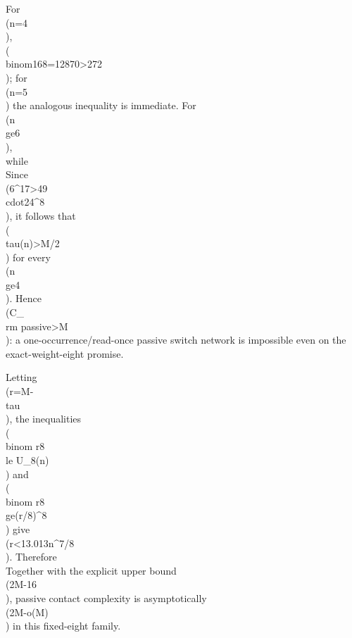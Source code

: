 For \\(n=4\\), \\(\\binom{16}{8}=12870>272\\); for \\(n=5\\) the analogous inequality is immediate.
For \\(n\\ge6\\),
\\[
\\frac M2=4\\binom n3\\ge n^3/3,\\qquad
\\binom{M/2}{8}\\ge(n^3/24)^8,
\\]
while
\\[ U_8(n)\\le(581/12)n^7<49n^7. \\]
Since \\(6^{17}>49\\cdot24^8\\), it follows that \\(\\tau(n)>M/2\\) for every \\(n\\ge4\\).
Hence \\(C_{\\rm passive}>M\\): a one-occurrence/read-once passive switch network is
impossible even on the exact-weight-eight promise.

Letting \\(r=M-\\tau\\), the inequalities \\(\\binom r8\\le U_8(n)\\) and
\\(\\binom r8\\ge(r/8)^8\\) give \\(r<13.013n^{7/8}\\). Therefore
\\[
\\boxed{C_{\\rm passive}(n,8)\\ge2M-26.026n^{7/8}.}
\\]
Together with the explicit upper bound \\(2M-16\\), passive contact complexity is asymptotically
\\(2M-o(M)\\) in this fixed-eight family.

